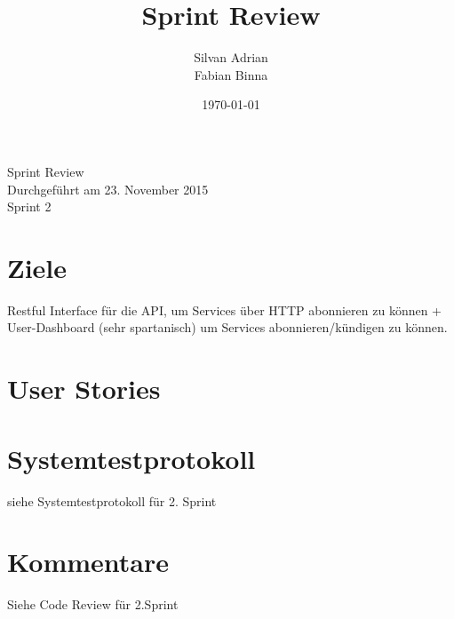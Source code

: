 \documentclass[11pt]{scrartcl}
\title{Sprint Review}
\author{Silvan Adrian \\ Fabian Binna}
\date{\today{}}
\begin{document}
\def\arraystretch{1.5}
\begin{titlepage}
\begin{center}
\vspace{10em}

\vspace{10em}
\end{center}
\begin{center}
\huge {Sprint Review}\\

Durchgeführt am 23. November 2015\\
Sprint 2
\end{center}

\end{titlepage}

\newpage
\tableofcontents
\newpage

\section{Ziele}
Restful Interface für die API, um Services über HTTP 
abonnieren zu können + User-Dashboard (sehr spartanisch)  um Services 
abonnieren/kündigen zu können.

\section{User Stories}





\newpage

\section{Systemtestprotokoll}

siehe Systemtestprotokoll für 2. Sprint

\section{Kommentare}

Siehe Code Review für 2.Sprint
\end{document}
